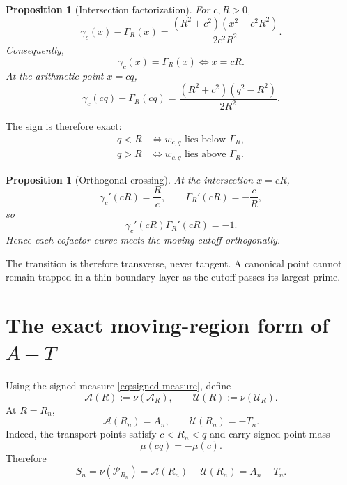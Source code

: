 \documentclass[11pt]{article}
\newtheorem{proposition}[theorem]{Proposition}
\theoremstyle{definition}
\theoremstyle{remark}
\newcommand{\1}{\mathbf{1}}
\begin{document}
\begin{proposition}[Intersection factorization]
\label{prop:intersection-factorization}
For $c,R>0$,
\begin{equation}
 \gamma_c(x)-\Gamma_R(x)
 =
 \frac{(R^2+c^2)(x^2-c^2R^2)}{2c^2R^2}.
 \label{eq:curve-gap}
\end{equation}
Consequently,
\begin{equation}
 \gamma_c(x)=\Gamma_R(x)
 \iff x=cR.
 \label{eq:curve-intersection}
\end{equation}
At the arithmetic point $x=cq$,
\begin{equation}
 \gamma_c(cq)-\Gamma_R(cq)
 =
 \frac{(R^2+c^2)(q^2-R^2)}{2R^2}.
 \label{eq:point-gap}
\end{equation}
\end{proposition}

The sign is therefore exact:
\begin{align}
 q<R&\iff w_{c,q}\text{ lies below }\Gamma_R,
 \label{eq:below}\\
 q>R&\iff w_{c,q}\text{ lies above }\Gamma_R.
 \label{eq:above}
\end{align}

\begin{proposition}[Orthogonal crossing]
\label{prop:orthogonal-crossing}
At the intersection $x=cR$,
\begin{equation}
 \gamma_c'(cR)=\frac{R}{c},
 \qquad
 \Gamma_R'(cR)=-\frac{c}{R},
 \label{eq:orthogonal-slopes}
\end{equation}
so
\begin{equation}
 \gamma_c'(cR)\Gamma_R'(cR)=-1.
 \label{eq:orthogonal-product}
\end{equation}
Hence each cofactor curve meets the moving cutoff orthogonally.
\end{proposition}

The transition is therefore transverse, never tangent.  A canonical point cannot remain trapped in a thin boundary layer as the cutoff passes its largest prime.

\section{The exact moving-region form of $A-T$}
\label{sec:moving-region-AT}

Using the signed measure \cref{eq:signed-measure}, define
\begin{equation}
 \mathcal A(R):=\nu(\mathscr A_R),
 \qquad
 \mathcal U(R):=\nu(\mathscr U_R).
 \label{eq:AU-measures}
\end{equation}
At $R=R_n$,
\begin{equation}
 \mathcal A(R_n)=A_n,
 \qquad
 \mathcal U(R_n)=-T_n.
 \label{eq:AU-AT}
\end{equation}
Indeed, the transport points satisfy $c<R_n<q$ and carry signed point mass
\[
 \mu(cq)=-\mu(c).
\]
Therefore
\begin{equation}
 \boxed{
 S_n
 =\nu(\mathscr P_{R_n})
 =\mathcal A(R_n)+\mathcal U(R_n)
 =A_n-T_n.
 }
 \label{eq:geometric-AT}
\end{equation}
\end{document}
